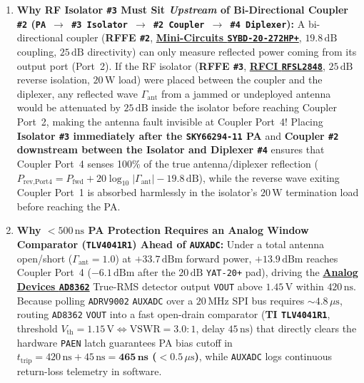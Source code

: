 \documentclass[10pt,a4paper]{article}
\renewcommand{\_}{\origunderscore\penalty0\hskip0pt\relax}
\numberwithin{equation}{section}
\numberwithin{table}{section}
\numberwithin{figure}{section}
\begin{document}
\begin{enumerate}\setlength{\itemsep}{3pt}
  \item \textbf{Why RF Isolator \texttt{\#3} Must Sit \emph{Upstream} of Bi-Directional Coupler \texttt{\#2} (\texttt{PA $\to$ \#3 Isolator $\to$ \#2 Coupler $\to$ \#4 Diplexer}):} A bi-directional coupler (\textbf{RFFE \texttt{\#2}}, \href{https://www.minicircuits.com/pdfs/SYBD-20-272HP+.pdf}{\textbf{Mini-Circuits \texttt{SYBD-20-272HP+}}}, $19.8\,\text{dB}$ coupling, $25\,\text{dB}$ directivity) can only measure reflected power coming from its output port (Port~2). If the RF isolator (\textbf{RFFE \texttt{\#3}}, \href{https://www.rfmw.com/products/detail/rfsl2848-rf-circulator-isolator/470641/}{\textbf{RFCI \texttt{RFSL2848}}}, $25\,\text{dB}$ reverse isolation, $20\,\text{W}$ load) were placed between the coupler and the diplexer, any reflected wave $\Gamma_{\text{ant}}$ from a jammed or undeployed antenna would be attenuated by $25\,\text{dB}$ inside the isolator before reaching Coupler Port~2, making the antenna fault invisible at Coupler Port~4! Placing \textbf{Isolator \texttt{\#3} immediately after the \texttt{SKY66294-11} PA} and \textbf{Coupler \texttt{\#2} downstream between the Isolator and Diplexer \texttt{\#4}} ensures that Coupler Port~4 senses 100\% of the true antenna/diplexer reflection ($P_{\text{rev,Port4}} = P_{\text{fwd}} + 20\log_{10}|\Gamma_{\text{ant}}| - 19.8\,\text{dB}$), while the reverse wave exiting Coupler Port~1 is absorbed harmlessly in the isolator's $20\,\text{W}$ termination load before reaching the PA.
  \item \textbf{Why $<500\,\text{ns}$ PA Protection Requires an Analog Window Comparator (\texttt{TLV4041R1}) Ahead of \texttt{AUXADC\_0}:} Under a total antenna open/short ($\Gamma_{\text{ant}} = 1.0$) at $+33.7\,\text{dBm}$ forward power, $+13.9\,\text{dBm}$ reaches Coupler Port~4 ($-6.1\,\text{dBm}$ after the $20\,\text{dB}$ \texttt{YAT-20+} pad), driving the \href{https://www.analog.com/media/en/technical-documentation/data-sheets/ad8362.pdf}{\textbf{Analog Devices \texttt{AD8362}}} True-RMS detector output \texttt{VOUT} above $1.45\,\text{V}$ within $420\,\text{ns}$. Because polling \texttt{ADRV9002} \texttt{AUXADC\_0} over a $20\,\text{MHz}$ SPI bus requires $\sim 4.8\,\mu\text{s}$, routing \texttt{AD8362} \texttt{VOUT} into a fast open-drain comparator (\textbf{TI \texttt{TLV4041R1}}, threshold $V_{\text{th}} = 1.15\,\text{V} \iff \text{VSWR} = 3.0:1$, delay $45\,\text{ns}$) that directly clears the hardware \texttt{PA\_EN} latch guarantees PA bias cutoff in \textbf{$t_{\text{trip}} = 420\,\text{ns} + 45\,\text{ns} = \mathbf{465\,\text{ns}}$ ($< 0.5\,\mu\text{s}$)}, while \texttt{AUXADC\_0} logs continuous return-loss telemetry in software.

\end{enumerate}
\end{document}
